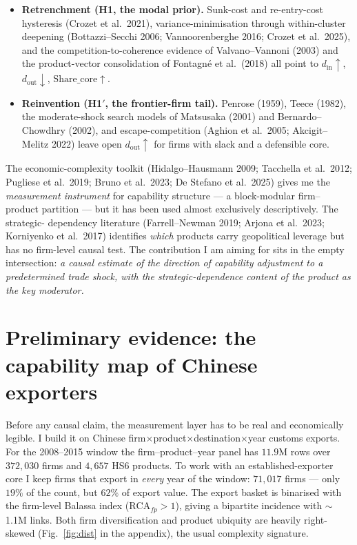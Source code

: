 \documentclass[11pt]{article}
\newcommand{\din}{d_{\mathrm{in}}}
\newcommand{\dout}{d_{\mathrm{out}}}
\newcommand{\sharecore}{\mathrm{Share\_core}}
\newcommand{\RCA}{\mathrm{RCA}}
\begin{document}
\begin{itemize}
  \item \textbf{Retrenchment (H1, the modal prior).} Sunk-cost and re-entry-cost
        hysteresis (Crozet et al.\ 2021), variance-minimisation through within-cluster
        deepening (Bottazzi--Secchi 2006; Vannoorenberghe 2016; Crozet et al.\ 2025),
        and the competition-to-coherence evidence of Valvano--Vannoni (2003) and the
        product-vector consolidation of Fontagn\'e et al.\ (2018) all point to
        $\din\!\uparrow$, $\dout\!\downarrow$, $\sharecore\!\uparrow$.
  \item \textbf{Reinvention (H1$'$, the frontier-firm tail).} Penrose (1959),
        Teece (1982), the moderate-shock search models of Matsusaka (2001) and
        Bernardo--Chowdhry (2002), and escape-competition (Aghion et al.\ 2005;
        Akcigit--Melitz 2022) leave open $\dout\!\uparrow$ for firms with slack and a
        defensible core.
\end{itemize}

\noindent The economic-complexity toolkit (Hidalgo--Hausmann 2009; Tacchella et al.\
2012; Pugliese et al.\ 2019; Bruno et al.\ 2023; De Stefano et al.\ 2025) gives me the
\emph{measurement instrument} for capability structure --- a block-modular firm--product
partition --- but it has been used almost exclusively descriptively. The strategic-%
dependency literature (Farrell--Newman 2019; Arjona et al.\ 2023; Korniyenko et al.\
2017) identifies \emph{which} products carry geopolitical leverage but has no firm-level
causal test. The contribution I am aiming for sits in the empty intersection:
\emph{a causal estimate of the direction of capability adjustment to a predetermined
trade shock, with the strategic-dependence content of the product as the key moderator.}

\section{Preliminary evidence: the capability map of Chinese exporters}
\label{sec:china}

Before any causal claim, the measurement layer has to be real and economically legible.
I build it on Chinese firm$\times$product$\times$destination$\times$year customs exports.
For the 2008--2015 window the firm--product--year panel has $11.9$M rows over $372{,}030$
firms and $4{,}657$ HS6 products. To work with an established-exporter core I keep firms
that export in \emph{every} year of the window: $71{,}017$ firms --- only $19\%$ of the
count, but $62\%$ of export value. The export basket is binarised with the firm-level
Balassa index ($\RCA_{fp}>1$), giving a bipartite incidence with $\sim$1.1M links. Both
firm diversification and product ubiquity are heavily right-skewed (Fig.~\ref{fig:dist}
in the appendix), the usual complexity signature.
\end{document}
